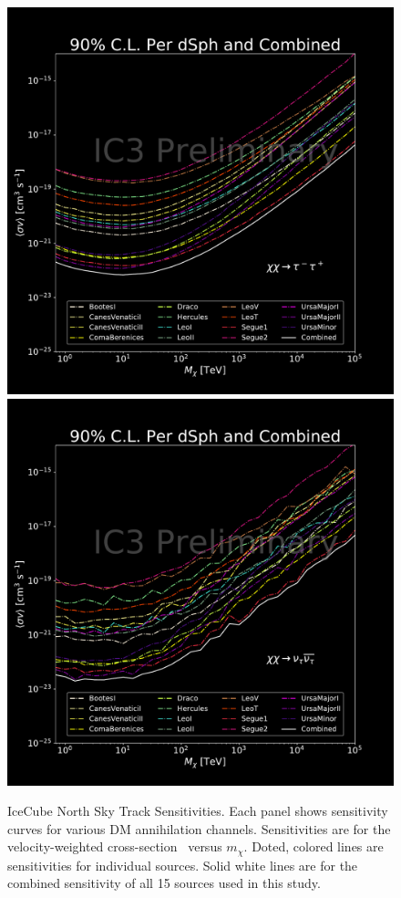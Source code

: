 \begin{figure}[h!]
{        \includegraphics[scale=0.265]{figures/ic_DM/dm_plots/tautau_money_plot_comb.pdf}
        \includegraphics[scale=0.265]{figures/ic_DM/dm_plots/nutaunutau_money_plot_comb.pdf}}
    \caption{IceCube North Sky Track Sensitivities. Each panel shows sensitivity curves for various DM annihilation channels. Sensitivities are for the velocity-weighted cross-section \sv~versus $m_\chi$. Doted, colored lines are sensitivities for individual sources. Solid white lines are for the combined sensitivity of all 15 \GS sources used in this study.}
    \label{fig:icDM_sensitivity_2of2}
\end{figure}

